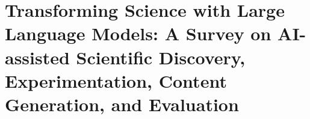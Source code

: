 \section{Transforming Science with Large Language Models: A Survey on AI-assisted Scientific Discovery, Experimentation, Content Generation, and Evaluation}

